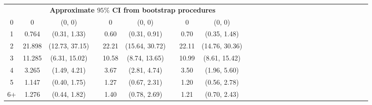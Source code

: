 \documentclass[a4paper 12pt]{article}
\numberwithin{equation}{section}
\begin{document}
\begin{tiny}
\begin{table}[h!]
\begin{tabular}{ccccccccccccccccccccccccccc}
 & \multicolumn{8}{c}{\bf Approximate $95 \%$ CI from bootstrap procedures} \\[1.5ex]
0  & 0      &(0, 0)         && 0      &  (0, 0)         && 0     & (0, 0)           \\[1ex]
1  & 0.764  &(0.31, 1.33)   && 0.60   &  (0.31, 0.91)   && 0.70  & (0.35, 1.48)    \\[1ex]
2  & 21.898 &(12.73, 37.15) && 22.21  &  (15.64, 30.72) && 22.11 & (14.76, 30.36) \\[1ex]
3  & 11.285 &(6.31, 15.02)  && 10.58  &  (8.74, 13.65)  && 10.99 & (8.61, 15.42)  \\[1ex]
4  & 3.265  &(1.49, 4.21)   && 3.67   &  (2.81, 4.74)   && 3.50  &(1.96, 5.60)   \\[1ex]
5  & 1.147  &(0.40, 1.75)   && 1.27   &  (0.67, 2.31)   && 1.20  &  (0.56, 2.78)   \\[1ex]
6+  & 1.276  &(0.44, 1.82)   && 1.40   &  (0.78, 2.69)   && 1.21  & (0.70, 2.43)  \\[1ex]
\hline
\end{tabular}
\end{table}
\end{tiny}
\end{document}
